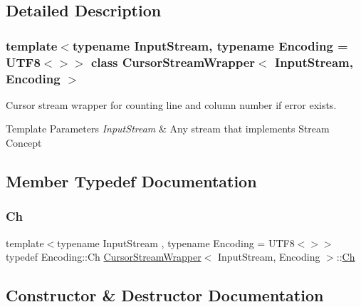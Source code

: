 \subsection{Detailed Description}
\subsubsection*{template$<$typename Input\+Stream, typename Encoding = U\+T\+F8$<$$>$$>$\newline
class Cursor\+Stream\+Wrapper$<$ Input\+Stream, Encoding $>$}

Cursor stream wrapper for counting line and column number if error exists. 


\begin{DoxyTemplParams}{Template Parameters}
{\em Input\+Stream} & Any stream that implements Stream Concept \\
\hline
\end{DoxyTemplParams}


\subsection{Member Typedef Documentation}
\mbox{\label{classCursorStreamWrapper_a4bab1186bfeebbcf00719c2613b0dca6}} 
\subsubsection{\texorpdfstring{Ch}{Ch}}
{\footnotesize\ttfamily template$<$typename Input\+Stream , typename Encoding  = U\+T\+F8$<$$>$$>$ \\
typedef Encoding\+::\+Ch \hyperlink{classCursorStreamWrapper}{Cursor\+Stream\+Wrapper}$<$ Input\+Stream, Encoding $>$\+::\hyperlink{classCursorStreamWrapper_a4bab1186bfeebbcf00719c2613b0dca6}{Ch}}



\subsection{Constructor \& Destructor Documentation}
\mbox{\label{classCursorStreamWrapper_a8d9a0109e19ab4fb7a79091cefe608a7}} 
